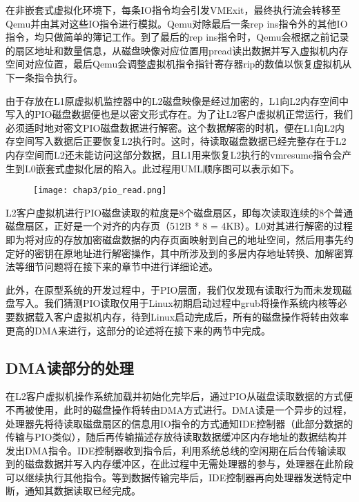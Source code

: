 在非嵌套式虚拟化环境下，每条IO指令均会引发VMExit，最终执行流会转移至Qemu并由其对这些IO指令进行模拟。Qemu对除最后一条rep ins指令外的其他IO指令，均只做简单的簿记工作。到了最后的rep ins指令时，Qemu会根据之前记录的扇区地址和数量信息，从磁盘映像对应位置用pread读出数据并写入虚拟机内存空间对应位置，最后Qemu会调整虚拟机指令指针寄存器rip的数值以恢复虚拟机从下一条指令执行。

由于存放在L1原虚拟机监控器中的L2磁盘映像是经过加密的，L1向L2内存空间中写入的PIO磁盘数据便也是以密文形式存在。为了让L2客户虚拟机正常运行，我们必须适时地对密文PIO磁盘数据进行解密。这个数据解密的时机，便在L1向L2内存空间写入数据后正要恢复L2执行时。这时，待读取磁盘数据已经完整存在于L2内存空间而L2还未能访问这部分数据，且L1用来恢复L2执行的vmresume指令会产生到L0嵌套式虚拟化层的陷入。此过程用UML顺序图可以表示如下。

\begin{figure}[!htbp]
  \centering
  \texttt{[image: chap3/pio\_read.png]}
\end{figure}

L2客户虚拟机进行PIO磁盘读取的粒度是8个磁盘扇区，即每次读取连续的8个普通磁盘扇区，正好是一个对齐的内存页（512B * 8 = 4KB）。L0对其进行解密的过程即为将对应的存放加密磁盘数据的内存页面映射到自己的地址空间，然后用事先约定好的密钥在原地址进行解密操作，其中所涉及到的多层内存地址转换、加解密算法等细节问题将在接下来的章节中进行详细论述。

此外，在原型系统的开发过程中，于PIO层面，我们仅发现有读取行为而未发现磁盘写入。我们猜测PIO读取仅用于Linux初期启动过程中grub将操作系统内核等必要数据载入客户虚拟机内存，待到Linux启动完成后，所有的磁盘操作将转由效率更高的DMA来进行，这部分的论述将在接下来的两节中完成。

\subsection{DMA读部分的处理}

在L2客户虚拟机操作系统加载并初始化完毕后，通过PIO从磁盘读取数据的方式便不再被使用，此时的磁盘操作将转由DMA方式进行。DMA读是一个异步的过程，处理器先将待读取磁盘扇区的信息用IO指令的方式通知IDE控制器（此部分数据的传输与PIO类似），随后再传输描述存放待读取数据缓冲区内存地址的数据结构并发出DMA指令。IDE控制器收到指令后，利用系统总线的空闲期在后台传输读取到的磁盘数据并写入内存缓冲区，在此过程中无需处理器的参与，处理器在此阶段可以继续执行其他指令。等到数据传输完毕后，IDE控制器再向处理器发送特定中断，通知其数据读取已经完成。


